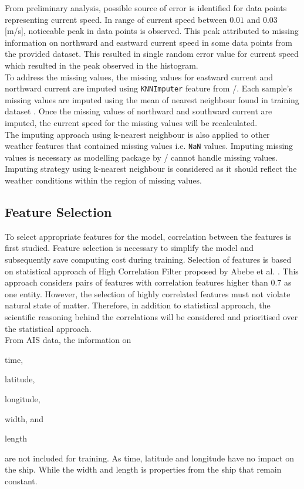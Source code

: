 From preliminary analysis, possible source of error is identified for data points representing current speed. In range of current speed between $0.01$ and $0.03$ [m/s], noticeable peak in data points is observed. This peak attributed to missing information on northward and eastward current speed in some data points from the provided dataset. This resulted in single random error value for current speed which resulted in the peak observed in the histogram.\\ 

To address the missing values, the missing values for eastward current and northward current are imputed using {\tt KNNImputer} feature from \scikit/. Each sample's missing values are imputed using the mean of nearest neighbour found in training dataset \cite{FabianPedregosa.2011}. Once the missing values of northward and southward current are imputed, the current speed for the missing values will be recalculated.\\ 

The imputing approach using k-nearest neighbour is also applied to other weather features that contained missing values i.e. {\tt NaN} values. Imputing missing values is necessary as modelling package by \scikit/ cannot handle missing values. Imputing strategy using k-nearest neighbour is considered as it should reflect the weather conditions within the region of missing values.\\

\subsection{Feature Selection}\label{sec:feature_select}

To select appropriate features for the model, correlation between the features is first studied. Feature selection is necessary to simplify the model and subsequently save computing cost during training. Selection of features is based on statistical approach of High Correlation Filter proposed by Abebe et al. \cite{Abebe.2020}. This approach considers pairs of features with correlation features higher than 0.7 as one entity. However, the selection of highly correlated features must not violate natural state of matter. Therefore, in addition to statistical approach, the scientific reasoning behind the correlations will be considered and prioritised over the statistical approach.\\

From AIS data, the information on \begin{enumerate*}[label={(\arabic*)}]
    \item time,
    \item latitude,
    \item longitude,
    \item width, and
    \item length
\end{enumerate*} are not included for training. As time, latitude and longitude have no impact on the ship. While the width and length is properties from the ship that remain constant.\\  

